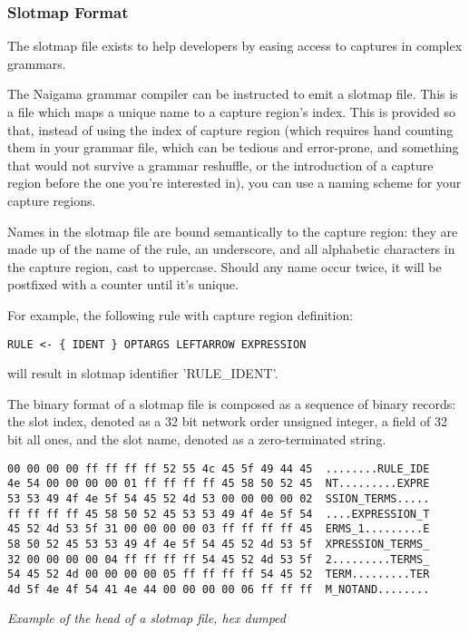 \subsubsection{Slotmap Format}

The slotmap file exists to help developers by easing access to
captures in complex grammars.

The Naigama grammar compiler can be instructed to emit a slotmap file.
This is a file which maps a unique name to a capture region's index.
This is provided so that, instead of using the index of capture region
(which requires hand counting them in your grammar file, which can be
tedious and error-prone, and something that would not survive
a grammar reshuffle, or the introduction of a capture region before
the one you're interested in), you can use a naming scheme for your
capture regions.

Names in the slotmap file are bound semantically to the capture region:
they are made up of the name of the rule,
an underscore, and all alphabetic characters in the capture region,
cast to uppercase. Should any name occur twice, it will be postfixed with
a counter until it's unique.

For example, the following rule with capture region definition:

\begin{myquote}
\begin{verbatim}
RULE <- { IDENT } OPTARGS LEFTARROW EXPRESSION
\end{verbatim}
\end{myquote}

will result in slotmap identifier 'RULE\_IDENT'.

The binary format of a slotmap file is composed as a sequence of binary records:
the slot index, denoted as a 32 bit network order unsigned integer, a
field of 32 bit all ones, and the slot name, denoted as a zero-terminated
string.

\begin{myquote}
\begin{verbatim}
00 00 00 00 ff ff ff ff 52 55 4c 45 5f 49 44 45  ........RULE_IDE
4e 54 00 00 00 00 01 ff ff ff ff 45 58 50 52 45  NT.........EXPRE
53 53 49 4f 4e 5f 54 45 52 4d 53 00 00 00 00 02  SSION_TERMS.....
ff ff ff ff 45 58 50 52 45 53 53 49 4f 4e 5f 54  ....EXPRESSION_T
45 52 4d 53 5f 31 00 00 00 00 03 ff ff ff ff 45  ERMS_1.........E
58 50 52 45 53 53 49 4f 4e 5f 54 45 52 4d 53 5f  XPRESSION_TERMS_
32 00 00 00 00 04 ff ff ff ff 54 45 52 4d 53 5f  2.........TERMS_
54 45 52 4d 00 00 00 00 05 ff ff ff ff 54 45 52  TERM.........TER
4d 5f 4e 4f 54 41 4e 44 00 00 00 00 06 ff ff ff  M_NOTAND........
\end{verbatim}
\end{myquote}
\textit{Example of the head of a slotmap file, hex dumped}

